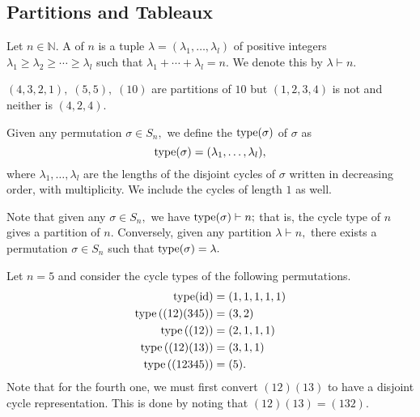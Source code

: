 \subsection{Partitions and Tableaux} \label{subsec:partsandtableaux}
\begin{defn}%
	\label{defn:partition}
	Let $n \in \mathbb{N}.$ A  of $n$ is a tuple $\lambda = (\lambda_1, \ldots, \lambda_l)$ of positive integers $\lambda_1 \ge \lambda_2 \ge \cdots \ge \lambda_l$ such that $\lambda_1 + \cdots + \lambda_l = n.$ We denote this by $\lambda \vdash n.$
\end{defn}

\begin{ex}
	$(4, 3, 2, 1),\;(5, 5),\;(10)$ are partitions of $10$ but $(1, 2, 3, 4)$ is not and neither is $(4, 2, 4).$
\end{ex}

\begin{defn}%
	Given any permutation $\sigma \in S_n,$ we define the  $\operatorname{type}(\sigma)$ of $\sigma$ as 
	\begin{equation*} 
		\operatorname{type}(\sigma) = (\lambda_1, \ldots, \lambda_l),
	\end{equation*} 
	where $\lambda_1, \ldots, \lambda_l$ are the lengths of the disjoint cycles of $\sigma$ written in decreasing order, with multiplicity. We include the cycles of length $1$ as well.
\end{defn}
\begin{rem}
	Note that given any $\sigma \in S_n,$ we have $\operatorname{type}(\sigma) \vdash n;$ that is, the cycle type of $n$ gives a partition of $n.$ Conversely, given any partition $\lambda \vdash n,$ there exists a permutation $\sigma \in S_n$ such that $\operatorname{type}(\sigma) = \lambda.$
\end{rem}

\begin{ex}
	Let $n = 5$ and consider the cycle types of the following permutations.
	\begin{align*} 
		\operatorname{type}(\operatorname{id}) &= (1, 1, 1, 1, 1)\\
		\operatorname{type}\left((12)(345)\right) &= (3, 2)\\
		\operatorname{type}\left((12)\right) &= (2, 1, 1, 1)\\
		\operatorname{type}\left((12)(13)\right) &= (3, 1, 1)\\
		\operatorname{type}\left((12345)\right) &= (5).
	\end{align*}
	Note that for the fourth one, we must first convert $(12)(13)$ to have a disjoint cycle representation. This is done by noting that $(12)(13) = (132).$
\end{ex}

